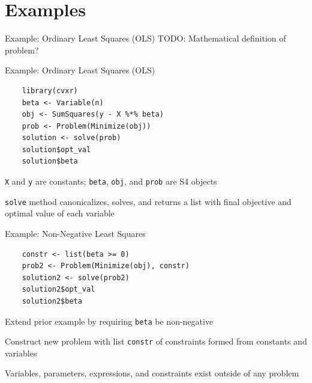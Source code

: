 \documentclass{beamer}
\begin{document}
\section{Examples}

\begin{frame}{Example: Ordinary Least Squares (OLS)}
	TODO: Mathematical definition of problem?
\end{frame}

\begin{frame}[fragile]{Example: Ordinary Least Squares (OLS)}
	\begin{verbatim}
	library(cvxr)
	beta <- Variable(n)
	obj <- SumSquares(y - X %*% beta)
	prob <- Problem(Minimize(obj))
	solution <- solve(prob)
	solution$opt_val
	solution$beta
	\end{verbatim}
	
	\BIT
		\item \verb|X| and \verb|y| are constants; \verb|beta|, \verb|obj|, and \verb|prob| are S4 objects
		\item \verb|solve| method canonicalizes, solves, and returns a list with final objective and optimal value of each variable
	\EIT
\end{frame}

\begin{frame}[fragile]{Example: Non-Negative Least Squares}
	\begin{verbatim}
	constr <- list(beta >= 0)
	prob2 <- Problem(Minimize(obj), constr)
	solution2 <- solve(prob2)
	solution2$opt_val
	solution2$beta
	\end{verbatim}
	
	\BIT
		\item Extend prior example by requiring \verb|beta| be non-negative
		\item Construct new problem with list \verb|constr| of constraints formed from constants and variables
		\item Variables, parameters, expressions, and constraints exist outside of any problem
	\EIT
\end{frame}
\end{document}
